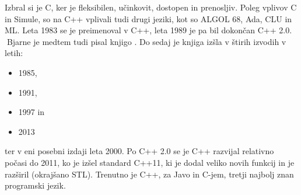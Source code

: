 \documentclass[12pt]{report}
\newcommand{\wdot}{\textcolor{white}{.}}
\newcommand{\odstavek}{\wdot \\ \wdot \qquad}
\begin{document}
			Izbral si je C, ker je fleksibilen, učinkovit, dostopen in prenosljiv.
			Poleg vplivov C in Simule, so na C++ vplivali tudi drugi jeziki, kot so ALGOL 68, Ada, CLU in ML.
			Leta 1983 se je  preimenoval v C++, leta 1989 je pa bil dokončan C++ 2.0.
			\odstavek Bjarne je medtem tudi pisal knjigo .
			Do sedaj je knjiga izšla v štirih izvodih v letih:~\cite{the_cpp_programming_language_wiki}\\
			\parbox{\textwidth}{
				\begin{itemize}
				\item 1985,
				\item 1991,
				\item 1997 in
				\item 2013
			\end{itemize}}
			ter v eni posebni izdaji leta 2000.
			Po C++ 2.0 se je C++ razvijal relativno počasi do 2011, ko je izšel standard C++11, ki je dodal veliko novih funkcij in je razširil  (okrajšano STL).
			Trenutno je C++, za Javo in C-jem, tretji najbolj znan programski jezik.~\cite{tiobe}
\end{document}
